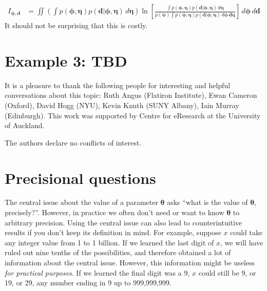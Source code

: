\documentclass[entropy,article,accept,oneauthor,pdftex,10pt,a4paper]{mdpi}
\renewcommand{\d}{\boldsymbol{d}}
\newcommand{\x}{\boldsymbol{\theta}}
\newcommand{\bphi}{\boldsymbol{\phi}}
\newcommand{\boldeta}{\boldsymbol{\eta}}
\begin{document}
\begin{align}
I_{\bphi, \d} &= \iint
  \left(\int p(\bphi, \boldeta)p(\d | \bphi, \boldeta) \, d\boldeta\right)
                        \ln \left[
  \frac{\int p(\bphi, \boldeta)p(\d | \bphi, \boldeta) \, d\boldeta}
{p(\bphi)\int p(\bphi, \boldeta)p(\d | \bphi, \boldeta) \, d\bphi \, \d\boldeta}\right]
                        \, d\bphi \, d\d
\end{align}
It should not be surprising that this is costly.



\section{Example 3: TBD}

It is a pleasure to thank the following people for interesting and helpful
conversations about this topic: Ruth Angus (Flatiron Institute),
Ewan Cameron (Oxford), David Hogg (NYU), Kevin Knuth (SUNY Albany),
Iain Murray (Edinburgh). This work was supported by Centre for eResearch
at the University of Auckland.




The authors declare no conflicts of interest.

%
\makeatletter
\renewcommand\@biblabel[1]{#1. }
\makeatother





\appendix
\section{Precisional questions}

The central issue about the value of a parameter $\x$ asks
``what is the value of $\x$, precisely?''. However, in practice we often
don't need or want to know $\x$ to arbitrary precision. Using the central
issue can also lead to counterintuitive results if you don't keep its
definition in mind. For example, suppose $x$ could take any integer value
from 1 to 1 billion. If we learned the last digit of $x$, we
will have ruled out nine tenths of the possibilities, and therefore obtained
a lot of information about the central issue. However,
this information might be useless {\em for practical purposes}.
If we learned the final
digit was a 9, $x$ could still be 9, or 19, or 29, any number ending in 9
up to 999,999,999.
\end{document}

